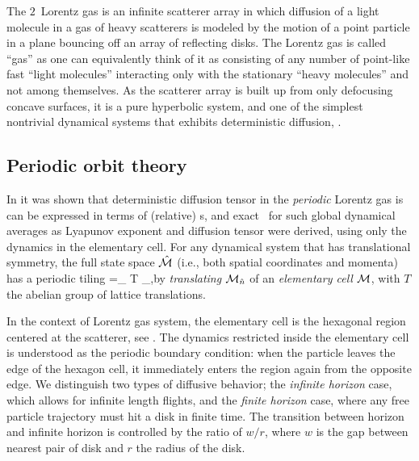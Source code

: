 \documentclass[aps,pre,
                showpacs,
                twocolumn,
                groupedaddress,
                floatfix]{revtex4-1}
\begin{document}
The $2$\dmn\ Lorentz gas is an infinite scatterer array in which diffusion of a
light molecule in a gas of heavy scatterers is modeled by the motion of a point
particle in a plane bouncing off an array of reflecting disks. The Lorentz gas
is called ``gas'' as one can equivalently think of it as consisting of any
number of point-like fast ``light molecules'' interacting only with the
stationary ``heavy molecules'' and not among themselves.  As the scatterer array
is built up from only defocusing concave surfaces, it is a pure hyperbolic
system, and one of the simplest nontrivial dynamical systems that exhibits
deterministic diffusion, .


\subsection{Periodic orbit theory}


In  it was shown that deterministic
diffusion tensor in the {\em periodic} Lorentz gas is can be expressed in terms
of (relative) \po s, and exact \cycForm\ for such global dynamical averages as
Lyapunov exponent and diffusion tensor were derived, using only the dynamics in
the elementary cell. For any dynamical system that has translational symmetry,
the full state space $\hat {{\cal M}}$ (i.e., both spatial coordinates and momenta) has a
periodic tiling \beq\hM=\bigcup_{ \hn \in T} \pS_{\hn},\eeq by {\em translating}
${\cal M}_{\hat n}$ of an {\em elementary cell} ${\cal M}$, with $T$ the abelian group of
lattice translations.

In the context of Lorentz gas system, the elementary cell is the hexagonal
region centered at the scatterer, see . The dynamics
restricted inside the elementary cell is understood as the periodic boundary
condition: when the particle leaves the edge of the hexagon cell, it immediately
enters the region again from the opposite edge. We distinguish two types of
diffusive behavior; the {\em infinite horizon} case, which allows for infinite
length flights, and the {\em finite horizon} case, where any free particle
trajectory must hit a disk in finite time. The transition between horizon and
infinite horizon is controlled by the ratio of $w/r$, where $w$ is the gap
between nearest pair of disk and $r$ the radius of the disk.
\end{document}
